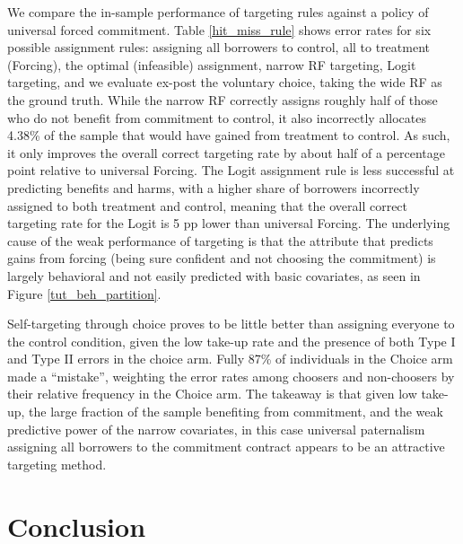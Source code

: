 \documentclass[ecta,nameyear,final]{econsocart}
\begin{document}
We compare the in-sample performance of targeting rules against a policy of universal forced commitment. Table \ref{hit_miss_rule} shows error rates for six possible assignment rules: assigning all borrowers to control, all to treatment (Forcing), the optimal (infeasible) assignment, narrow RF targeting, Logit targeting, and we evaluate ex-post the voluntary choice, taking the wide RF as the ground truth. While the narrow RF correctly assigns roughly half of those who do not benefit from commitment to control, it also incorrectly allocates 4.38\% of the sample that would have gained from treatment to control. As such, it only improves the overall correct targeting rate by about half of a percentage point relative to universal Forcing. The Logit assignment rule is less successful at predicting benefits and harms, with a higher share of borrowers incorrectly assigned to both treatment and control, meaning that the overall correct targeting rate for the Logit is 5 pp lower than universal Forcing. 
The underlying cause of the weak performance of targeting is that the attribute that predicts gains from forcing (being sure confident and not choosing the commitment) is largely behavioral and not easily predicted with basic covariates, as seen in Figure \ref{tut_beh_partition}. 

Self-targeting through choice proves to be little better than assigning everyone to the control condition, given the low take-up rate and the presence of both Type I and Type II errors in the choice arm. Fully 87\% of individuals in the Choice arm made a ``mistake'', weighting the error rates among choosers and non-choosers by their relative frequency in the Choice arm. The takeaway is that given low take-up, the large fraction of the sample benefiting from commitment, and the weak predictive power of the narrow covariates, in this case universal paternalism assigning all borrowers to the commitment contract appears to be an attractive targeting method.

    
\section{Conclusion} \label{conclusion}
\end{document}

